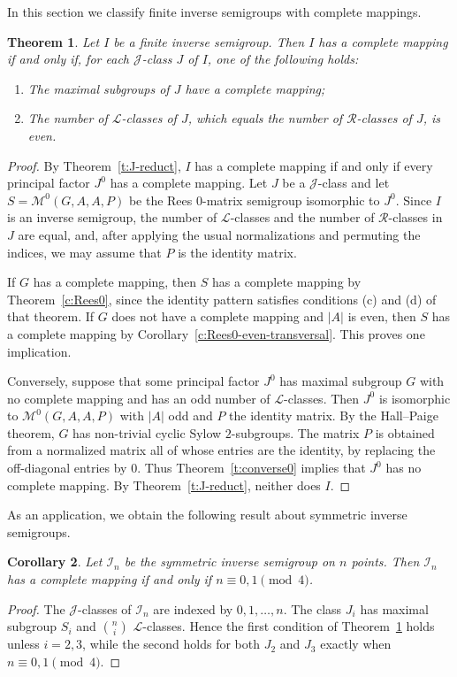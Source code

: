 \documentclass[11pt]{article}
\theoremstyle{plain}
\newtheorem{theorem}{Theorem}[section]
\newtheorem{cor}[theorem]{Corollary}
\theoremstyle{remark}
\theoremstyle{definition}
\theoremstyle{plain}
\begin{document}
In this section we classify finite inverse semigroups with complete mappings.

\begin{theorem}\label{t:inverse}
Let $I$ be a finite inverse semigroup. Then $I$ has a complete mapping if and only if, for each $\mathcal{J}$-class $J$ of $I$, one of the following holds:
\begin{enumerate}
\item The maximal subgroups of $J$ have a complete mapping;
\item The number of $\mathcal L$-classes of $J$, which equals the number of $\mathcal R$-classes of $J$, is even.
\end{enumerate}
\end{theorem}
\begin{proof}
By Theorem~\ref{t:J-reduct}, $I$ has a complete mapping if and only if every
principal factor $J^0$ has a complete mapping. Let $J$ be a $\mathcal J$-class
and let
\(S=\mathcal M^0(G,A,A,P)\)
be the Rees $0$-matrix semigroup isomorphic to $J^0$. Since $I$ is an inverse
semigroup, the number of $\mathcal L$-classes and the number of $\mathcal R$-classes
in $J$ are equal, and, after applying the usual normalizations and permuting the
indices, we may assume that $P$ is the identity matrix.

If $G$ has a complete mapping, then $S$ has a complete mapping by
Theorem~\ref{c:Rees0}, since the identity pattern satisfies conditions (c) and
(d) of that theorem. If $G$ does not have a complete mapping and $|A|$ is even,
then $S$ has a complete mapping by Corollary~\ref{c:Rees0-even-transversal}.
This proves one implication.

Conversely, suppose that some principal factor $J^0$ has maximal subgroup $G$
with no complete mapping and has an odd number of $\mathcal L$-classes. Then
$J^0$ is isomorphic to $\mathcal M^0(G,A,A,P)$ with $|A|$ odd and $P$ the
identity matrix. By the Hall--Paige theorem, $G$ has non-trivial cyclic Sylow
$2$-subgroups. The matrix $P$ is obtained from a normalized matrix all of
whose entries are the identity, by replacing the off-diagonal entries by $0$.
Thus Theorem~\ref{t:converse0} implies that $J^0$ has no complete mapping.
By Theorem~\ref{t:J-reduct}, neither does $I$.
\end{proof}

As an application, we obtain the following result about symmetric inverse semigroups.

\begin{cor}
Let $\mathcal I_n$ be the symmetric inverse semigroup on $n$ points. Then $\mathcal I_n$ has a complete mapping if and only if $n\equiv0,1\pmod 4$.
\end{cor}
\begin{proof}
The $\mathcal J$-classes of $\mathcal I_n$ are indexed by $0,1,\ldots,n$. The class $J_i$ has maximal subgroup $S_i$ and $\binom ni$ $\mathcal L$-classes. Hence the first condition of Theorem~\ref{t:inverse} holds unless $i=2,3$, while the second holds for both $J_2$ and $J_3$ exactly when $n\equiv0,1\pmod 4$.
\end{proof}
\end{document}
